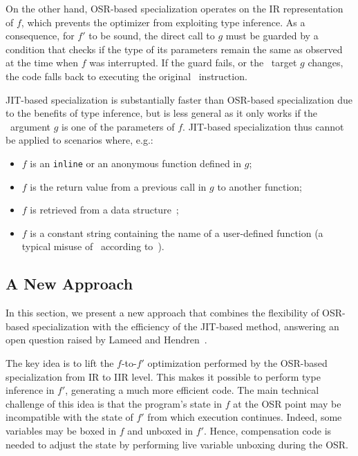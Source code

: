On the other hand, OSR-based specialization operates on the IR representation of $f$, which prevents the optimizer from exploiting type inference. As a consequence, for $f'$ to be sound, the direct call to $g$ must be guarded by a condition that checks if the type of its parameters remain the same as observed at the time when $f$ was interrupted. If the guard fails, or the \feval\ target $g$ changes, the code falls back to executing the original \feval\ instruction.

JIT-based specialization is substantially faster than OSR-based specialization due to the benefits of type inference, but is less general as it only works if the \feval\ argument $g$ is one of the parameters of $f$. JIT-based specialization thus cannot be applied to scenarios where, e.g.:
\begin{itemize}[itemsep=0pt,parsep=3pt,partopsep=0pt]
\item $f$ is an {\tt inline} or an anonymous function defined in $g$;
\item $f$ is the return value from a previous call in $g$ to another function;
\item $f$ is retrieved from a data structure~\cite{Lameed2013b};
\item $f$ is a constant string containing the name of a user-defined function (a typical misuse of \feval\ according to~\cite{Radpour2013}).
\end{itemize}

\subsection{A New Approach}
\label{ss:CS-new-eval-sol}

In this section, we present a new approach that combines the flexibility of OSR-based specialization with the efficiency of the JIT-based method, answering an open question raised by Lameed and Hendren~\cite{Lameed2013b}.

The key idea is to lift the $f$-to-$f'$ optimization performed by the OSR-based specialization from IR to IIR level. This makes it possible to perform type inference in $f'$, generating a much more efficient code. The main technical challenge of this idea is that the program's state in $f$ at the OSR point may be incompatible with the state of $f'$ from which execution continues. Indeed, some variables may be boxed in $f$ and unboxed in $f'$. Hence, compensation code is needed to adjust the state by performing live variable unboxing during the OSR.

